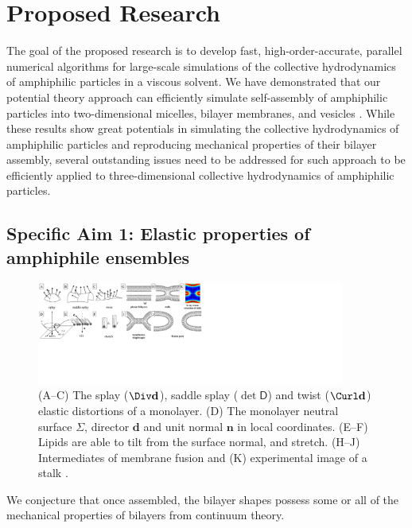 \section{Proposed Research}
\label{sec:proposed-work}
The goal of the proposed research is to develop fast,
high-order-accurate, parallel numerical algorithms for large-scale
simulations of the collective hydrodynamics of  amphiphilic particles in a viscous solvent.
%
We have demonstrated that 
our potential theory approach can efficiently simulate self-assembly of 
amphiphilic particles into two-dimensional micelles, bilayer membranes, and vesicles \cite{Fu19}.
%
While these results show great potentials in simulating the collective hydrodynamics of amphiphilic particles and
reproducing mechanical properties of their bilayer assembly, 
several outstanding issues need to be addressed for such approach to be efficiently applied to three-dimensional 
collective hydrodynamics of amphiphilic particles.


\subsection{Specific Aim 1: Elastic properties of amphiphile ensembles}
\label{subsec:specific_aim_1}

\begin{figure}
\begin{center}
\includegraphics[width=0.9\textwidth]{figures/SA1_fig1.pdf}
\end{center}
\caption{\footnotesize (A--C) The splay ($\Div \mathbf{d}$), 
saddle splay ($\det \mathsf{D}$) and twist ($\Curl \mathbf{d}$) elastic distortions of 
a monolayer. (D) The monolayer neutral surface $\Sigma$,  
director $\mathbf{d}$ and unit normal $\mathbf{n}$ in local coordinates.
(E--F) Lipids are able to tilt from  the surface normal, and stretch.
(H--J) Intermediates of membrane fusion and (K) experimental image of a stalk \cite{Aeffner2012}. }
\label{fig:distortions}
\end{figure}


 We conjecture that 
once assembled, the bilayer shapes possess some or all of the mechanical properties of bilayers from continuum theory. 

